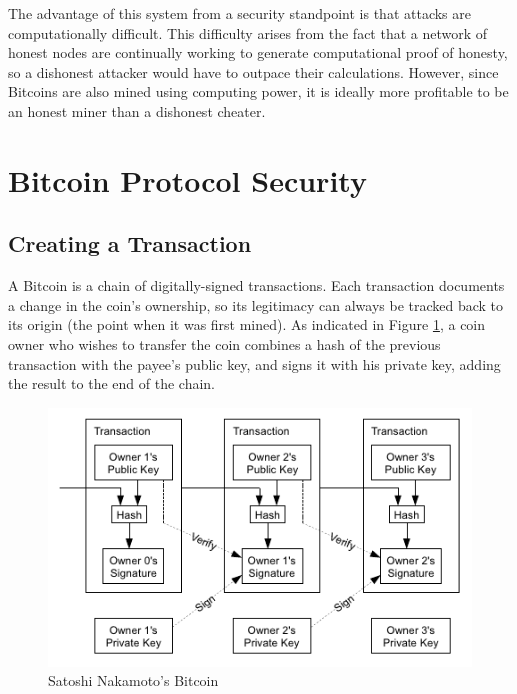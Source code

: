 \documentclass{report}
\begin{document}
The advantage of this system from a security standpoint is that attacks are computationally difficult. This difficulty arises from the fact that a network of honest nodes are continually working to generate computational proof of honesty, so a dishonest attacker would have to outpace their calculations. However, since Bitcoins are also mined using computing power, it is ideally more profitable to be an honest miner than a dishonest cheater.




\section*{Bitcoin Protocol Security}
  \subsection*{Creating a Transaction}
    A Bitcoin is a chain of digitally-signed transactions. Each transaction documents a change in the coin's ownership, so its legitimacy can always be tracked back to its origin (the point when it was first mined). As indicated in Figure \ref{fig:coinchain}, a coin owner who wishes to transfer the coin combines a hash of the previous transaction with the payee's public key, and signs it with his private key, adding the result to the end of the chain.
    \begin{figure}[h]
      \begin{center}
        \includegraphics{images/coinchain.png}
        \caption{Satoshi Nakamoto's Bitcoin \cite{Nakamoto:Bitcoin}}
        \label{fig:coinchain}
      \end{center}
    \end{figure}
    
\end{document}
